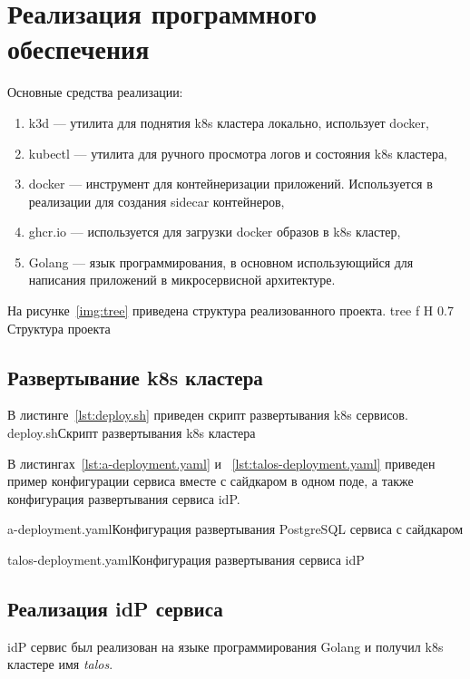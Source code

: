 \chapter{Реализация программного обеспечения}

Основные средства реализации:
\begin{enumerate}
\item k3d --- утилита для поднятия k8s кластера локально, использует docker, %
\item kubectl --- утилита для ручного просмотра логов и состояния k8s кластера,
\item docker --- инструмент для контейнеризации приложений. Используется в реализации для создания sidecar контейнеров,
\item ghcr.io --- используется для загрузки docker образов в k8s кластер,
\item Golang --- язык программирования, в основном использующийся для написания приложений в микросервисной архитектуре. %
\end{enumerate}

На рисунке~\ref{img:tree} приведена структура реализованного проекта.
    {tree}
    {f}
    {H}
    {0.7\textwidth}
    {Структура проекта}
    
\section{Развертывание k8s кластера}
В листинге~\ref{lst:deploy.sh} приведен скрипт развертывания k8s сервисов. 
	{deploy.sh}{Скрипт развертывания k8s кластера}

В листингах~\ref{lst:a-deployment.yaml} и ~\ref{lst:talos-deployment.yaml} приведен пример  конфигурации сервиса вместе с сайдкаром в одном поде, а также конфигурация развертывания сервиса idP. 

	{a-deployment.yaml}{Конфигурация развертывания PostgreSQL сервиса с сайдкаром}

	{talos-deployment.yaml}{Конфигурация развертывания сервиса idP}
	
\section{Реализация idP сервиса}

idP сервис был реализован на языке программирования Golang и получил k8s кластере имя \textit{talos}.


